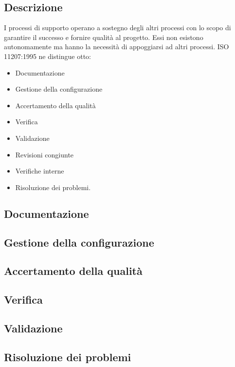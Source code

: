\documentclass[../norme-di-progetto.tex]{subfiles}
\begin{document}
\subsection{Descrizione}%
\label{sub:processi_di_supporto/descrizione}

I processi di supporto operano a sostegno degli altri processi con lo scopo di garantire il successo e fornire qualità al progetto.
Essi non esistono autonomamente ma hanno la necessità di appoggiarsi ad altri processi.
ISO 11207:1995 ne distingue otto:

\begin{itemize}
  \item Documentazione
  \item Gestione della configurazione
  \item Accertamento della qualità
  \item Verifica
  \item Validazione
  \item Revisioni congiunte
  \item Verifiche interne
  \item Risoluzione dei problemi.
\end{itemize}

\subsection{Documentazione}%
\label{sub:documentazione}



\subsection{Gestione della configurazione}%
\label{sub:gestione_della_configurazione}



\subsection{Accertamento della qualità}%
\label{subs:accertamento_della_qualita}



\subsection{Verifica}%
\label{sub:verifica}



\subsection{Validazione}%
\label{sub:validazione}



\subsection{Risoluzione dei problemi}%
\label{sub:processo_di_risoluzione_dei_problemi}


\end{document}
